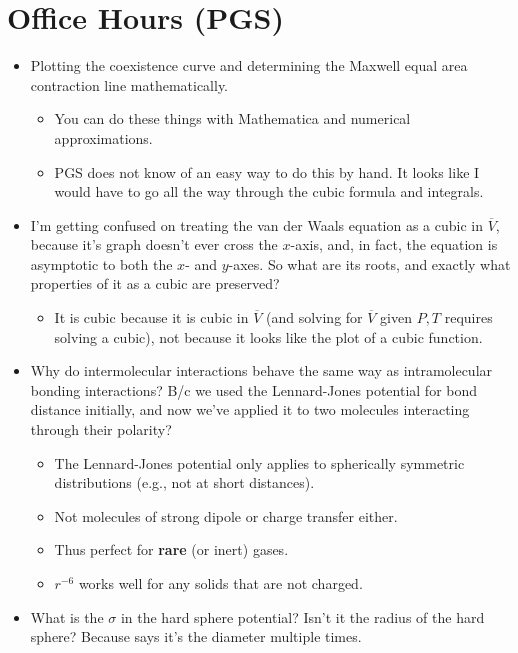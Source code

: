 \documentclass[../notes.tex]{subfiles}
\begin{document}
\section{Office Hours (PGS)}
\begin{itemize}
    \item {}Plotting the coexistence curve and determining the Maxwell equal area contraction line mathematically.
    \begin{itemize}
        \item You can do these things with Mathematica and numerical approximations.
        \item PGS does not know of an easy way to do this by hand. It looks like I would have to go all the way through the cubic formula and integrals.
    \end{itemize}
    \item I'm getting confused on treating the van der Waals equation as a cubic in $\overline{V}$, because it's graph doesn't ever cross the $x$-axis, and, in fact, the equation is asymptotic to both the $x$- and $y$-axes. So what are its roots, and exactly what properties of it as a cubic are preserved?
    \begin{itemize}
        \item It is cubic because it is cubic in $\overline{V}$ (and solving for $\overline{V}$ given $P,T$ requires solving a cubic), not because it looks like the plot of a cubic function.
    \end{itemize}
    \item Why do intermolecular interactions behave the same way as intramolecular bonding interactions? B/c we used the Lennard-Jones potential for bond distance initially, and now we've applied it to two molecules interacting through their polarity?
    \begin{itemize}
        \item The Lennard-Jones potential only applies to spherically symmetric distributions (e.g., not  at short distances).
        \item Not molecules of strong dipole or charge transfer either.
        \item Thus perfect for \textbf{rare} (or inert) gases.
        \item $r^{-6}$ works well for any solids that are not charged.
    \end{itemize}
    \item What is the $\sigma$ in the hard sphere potential? Isn't it the radius of the hard sphere? Because \textcite{bib:McQuarrieSimon} says it's the diameter multiple times.

\end{itemize}
\end{document}
